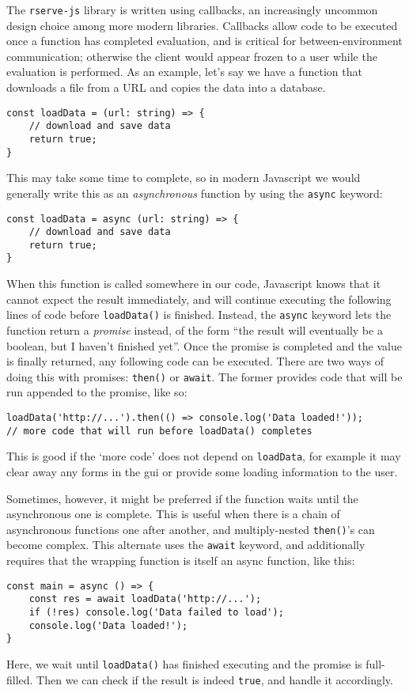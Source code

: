 \documentclass{article}
\newcommand{\pkg}[1]{\texttt{#1}}
\begin{document}
The \pkg{rserve-js} library is written using callbacks, an increasingly uncommon design choice among more modern libraries.
Callbacks allow code to be executed once a function has completed evaluation, and is critical for between-environment communication;
otherwise the client would appear frozen to a user while the evaluation is performed.
As an example, let's say we have a function that downloads a file from a URL and copies the data into a database.
\begin{verbatim}
const loadData = (url: string) => {
    // download and save data
    return true;
}
\end{verbatim}
This may take some time to complete, so in modern Javascript we would generally write this as an \emph{asynchronous} function by using the \verb+async+ keyword:
\begin{verbatim}
const loadData = async (url: string) => {
    // download and save data
    return true;
}
\end{verbatim}
When this function is called somewhere in our code, Javascript knows that it cannot expect the result immediately, and will continue executing the following lines of code before \verb+loadData()+ is finished.
Instead, the \verb+async+ keyword lets the function return a \emph{promise} instead, of the form ``the result will eventually be a boolean, but I haven't finished yet''.
Once the promise is completed and the value is finally returned, any following code can be executed.
There are two ways of doing this with promises: \verb+then()+ or \verb+await+.
The former provides code that will be run appended to the promise, like so:
\begin{verbatim}
loadData('http://...').then(() => console.log('Data loaded!'));
// more code that will run before loadData() completes
\end{verbatim}
This is good if the `more code' does not depend on \verb+loadData+, for example it may clear away any forms in the \gls{gui} or provide some loading information to the user.

Sometimes, however, it might be preferred if the function waits until the asynchronous one is complete.
This is useful when there is a chain of asynchronous functions one after another, and multiply-nested \verb+then()+'s can become complex.
This alternate uses the \verb+await+ keyword, and additionally requires that the wrapping function is itself an async function, like this:
\begin{verbatim}
const main = async () => {
    const res = await loadData('http://...');
    if (!res) console.log('Data failed to load');
    console.log('Data loaded!');
}
\end{verbatim}
Here, we wait until \verb+loadData()+ has finished executing and the promise is full-filled.
Then we can check if the result is indeed \verb+true+, and handle it accordingly.
\end{document}
